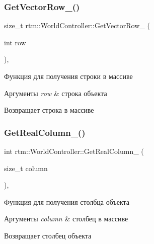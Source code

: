 \subsubsection{\texorpdfstring{Get\+Vector\+Row\+\_\+()}{GetVectorRow\_()}}
{\footnotesize\ttfamily size\+\_\+t rtm\+::\+World\+Controller\+::\+Get\+Vector\+Row\+\_\+ (\begin{DoxyParamCaption}\item[{int}]{row }\end{DoxyParamCaption})\hspace{0.3cm}{\ttfamily [inline]}, {\ttfamily [private]}}



Функция для получения строки в массиве 


\begin{DoxyParams}{Аргументы}
{\em row} & строка объекта \\
\hline
\end{DoxyParams}
\begin{DoxyReturn}{Возвращает}
строка в массиве 
\end{DoxyReturn}
\mbox{\label{classrtm_1_1_world_controller_a73f4df1b8493c6d6d0a6b3cdb21a076c}} 
\subsubsection{\texorpdfstring{Get\+Real\+Column\+\_\+()}{GetRealColumn\_()}}
{\footnotesize\ttfamily int rtm\+::\+World\+Controller\+::\+Get\+Real\+Column\+\_\+ (\begin{DoxyParamCaption}\item[{size\+\_\+t}]{column }\end{DoxyParamCaption})\hspace{0.3cm}{\ttfamily [inline]}, {\ttfamily [private]}}



Функция для получения столбца объекта 


\begin{DoxyParams}{Аргументы}
{\em column} & столбец в массиве \\
\hline
\end{DoxyParams}
\begin{DoxyReturn}{Возвращает}
столбец объекта 
\end{DoxyReturn}
\mbox{\label{classrtm_1_1_world_controller_a3aad7b071f3e8a80ab159e89ec5c8035}} 
